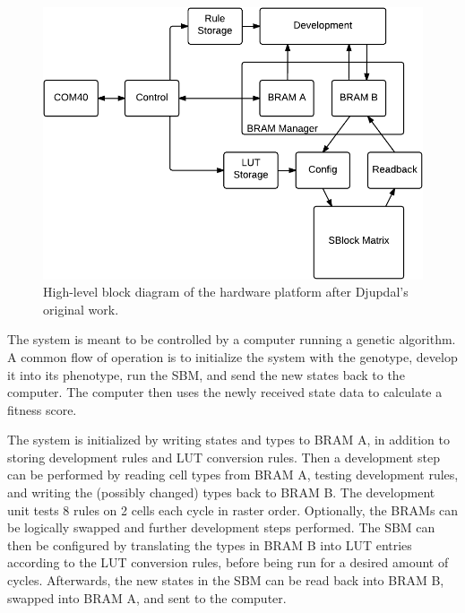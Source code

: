 \begin{figure}[!ht]
    \centering
    \includegraphics[width=42\block]{figures/overview-djupdal}
    \caption[Djupdal's hardware design]{
        High-level block diagram of the hardware platform after Djupdal's original work.
    }
    \label{fig:overview-djupdal}
\end{figure}

The system is meant to be controlled by a computer running a genetic algorithm.
A common flow of operation is to initialize the system with the genotype, develop it into its phenotype, run the SBM, and send the new states back to the computer.
The computer then uses the newly received state data to calculate a fitness score.

The system is initialized by writing states and types to BRAM A, in addition to storing development rules and LUT conversion rules.
Then a development step can be performed by reading cell types from BRAM A\footnotemark, testing development rules, and writing the (possibly changed) types back to BRAM B.
The development unit tests 8 rules on 2 cells each cycle in raster order.
Optionally, the BRAMs can be logically swapped and further development steps performed.
The SBM can then be configured by translating the types in BRAM B into LUT entries according to the LUT conversion rules, before being run for a desired amount of cycles.
Afterwards, the new states in the SBM can be read back into BRAM B, swapped into BRAM A, and sent to the computer.

